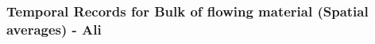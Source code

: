 \documentclass{article}
\begin{document}
%
%

\subsubsection{Temporal Records for Bulk of flowing material (Spatial averages) - Ali}
\end{document}
